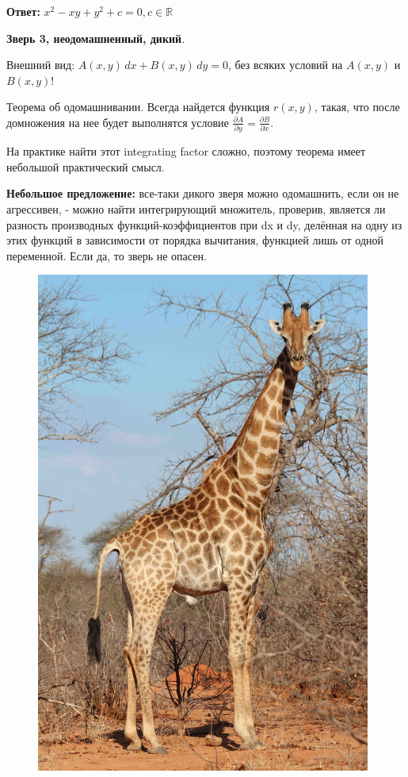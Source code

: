 \documentclass[10pt,a4paper]{article}
\begin{document}
\par \textbf{Ответ:} $x^2 - xy + y^2 + c = 0, c \in \mathbb{R}$ \\
\par \textbf{Зверь 3, неодомашненный, дикий}.
\par Внешний вид: $A(x, y) \, dx + B(x,y) \, dy = 0$, без всяких условий на $A(x,y)$ и $B(x,y)$!
\par Теорема об одомашнивании. Всегда найдется функция $r(x,y)$, такая, что после домножения на нее будет выполнятся условие $\frac{\partial{A}}{\partial{y}} = \frac{\partial{B}}{\partial{x}}$.
\par На практике найти этот integrating factor сложно, поэтому теорема имеет небольшой практический смысл. \\
\par \textbf{Небольшое предложение:} все-таки дикого зверя можно одомашнить, если
он не агрессивен, - можно найти интегрирующий множитель, проверив,
является ли разность производных функций-коэффициентов при dx и dy,
делённая на одну из этих функций в зависимости от порядка вычитания,
функцией лишь от одной переменной. Если да, то зверь не опасен.
\newpage
\pagecolor{JungleGreen}
\begin{figure}[h]
\centering
\includegraphics[width = 11cm]{giraffe.jpg}
\end{figure}
\end{document}
